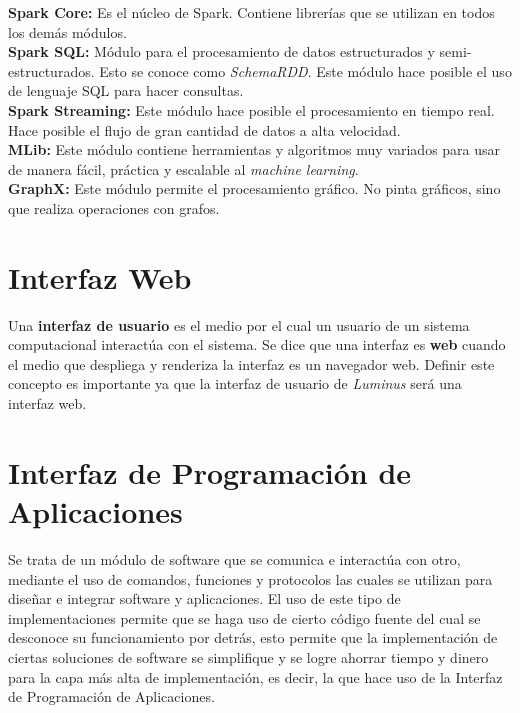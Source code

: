 \begin{UClist}
	\UCli \textbf{Spark Core:} Es el núcleo de Spark. Contiene librerías que se utilizan en todos los demás módulos.\\

	\UCli \textbf{Spark SQL:} Módulo para el procesamiento de datos estructurados y semi-estructurados. Esto se conoce como \emph{SchemaRDD}. Este módulo hace posible el uso de lenguaje SQL para hacer consultas.\\

	\UCli \textbf{Spark Streaming:} Este módulo hace posible el procesamiento en tiempo real. Hace posible el flujo de gran cantidad de datos a alta velocidad.\\

	\UCli \textbf{MLib:} Este módulo contiene herramientas y algoritmos muy variados para usar de manera fácil, práctica y escalable al \emph{machine learning}.\\

	\UCli \textbf{GraphX:} Este módulo permite el procesamiento gráfico. No pinta gráficos, sino que realiza operaciones con grafos.\\

\end{UClist}

\section{Interfaz Web}
Una \textbf{interfaz de usuario} es el medio por el cual un usuario de un sistema computacional interactúa con el sistema. Se dice que una interfaz es \textbf{web} cuando el medio que despliega y renderiza la interfaz es un navegador web. Definir este concepto es importante ya que la interfaz de usuario de \emph{Luminus} será una interfaz web.\\

\section{Interfaz de Programación de Aplicaciones}
Se trata de un módulo de software que se comunica e interactúa con otro, mediante el uso de comandos, funciones y protocolos las cuales se utilizan para diseñar e integrar software y aplicaciones.\cite{Red} 
El uso de este tipo de implementaciones permite que se haga uso de cierto código fuente del cual se desconoce su funcionamiento por detrás, esto permite que la implementación de ciertas soluciones de software se simplifique y se logre ahorrar tiempo y dinero para la capa más alta de implementación, es decir, la que hace uso de la Interfaz de Programación de Aplicaciones.\\ 

